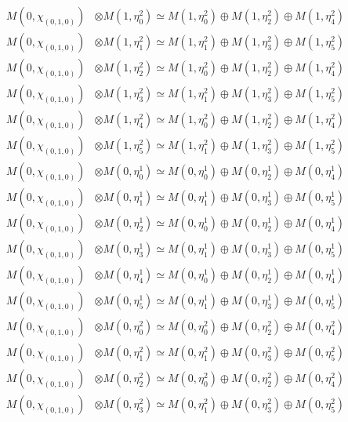 \begin{align*}
M(0,\chi_{(0,1,0)}) &\otimes M(1,\eta^{2}_{0}) \simeq M(1,\eta^{2}_{0}) \oplus M(1,\eta^{2}_{2}) \oplus M(1,\eta^{2}_{4}) \\
M(0,\chi_{(0,1,0)}) &\otimes M(1,\eta^{2}_{1}) \simeq M(1,\eta^{2}_{1}) \oplus M(1,\eta^{2}_{3}) \oplus M(1,\eta^{2}_{5}) \\
M(0,\chi_{(0,1,0)}) &\otimes M(1,\eta^{2}_{2}) \simeq M(1,\eta^{2}_{0}) \oplus M(1,\eta^{2}_{2}) \oplus M(1,\eta^{2}_{4}) \\
M(0,\chi_{(0,1,0)}) &\otimes M(1,\eta^{2}_{3}) \simeq M(1,\eta^{2}_{1}) \oplus M(1,\eta^{2}_{3}) \oplus M(1,\eta^{2}_{5}) \\
M(0,\chi_{(0,1,0)}) &\otimes M(1,\eta^{2}_{4}) \simeq M(1,\eta^{2}_{0}) \oplus M(1,\eta^{2}_{2}) \oplus M(1,\eta^{2}_{4}) \\
M(0,\chi_{(0,1,0)}) &\otimes M(1,\eta^{2}_{5}) \simeq M(1,\eta^{2}_{1}) \oplus M(1,\eta^{2}_{3}) \oplus M(1,\eta^{2}_{5}) \\
M(0,\chi_{(0,1,0)}) &\otimes M(0,\eta^{1}_{0}) \simeq M(0,\eta^{1}_{0}) \oplus M(0,\eta^{1}_{2}) \oplus M(0,\eta^{1}_{4}) \\
M(0,\chi_{(0,1,0)}) &\otimes M(0,\eta^{1}_{1}) \simeq M(0,\eta^{1}_{1}) \oplus M(0,\eta^{1}_{3}) \oplus M(0,\eta^{1}_{5}) \\
M(0,\chi_{(0,1,0)}) &\otimes M(0,\eta^{1}_{2}) \simeq M(0,\eta^{1}_{0}) \oplus M(0,\eta^{1}_{2}) \oplus M(0,\eta^{1}_{4}) \\
M(0,\chi_{(0,1,0)}) &\otimes M(0,\eta^{1}_{3}) \simeq M(0,\eta^{1}_{1}) \oplus M(0,\eta^{1}_{3}) \oplus M(0,\eta^{1}_{5}) \\
M(0,\chi_{(0,1,0)}) &\otimes M(0,\eta^{1}_{4}) \simeq M(0,\eta^{1}_{0}) \oplus M(0,\eta^{1}_{2}) \oplus M(0,\eta^{1}_{4}) \\
M(0,\chi_{(0,1,0)}) &\otimes M(0,\eta^{1}_{5}) \simeq M(0,\eta^{1}_{1}) \oplus M(0,\eta^{1}_{3}) \oplus M(0,\eta^{1}_{5}) \\
M(0,\chi_{(0,1,0)}) &\otimes M(0,\eta^{2}_{0}) \simeq M(0,\eta^{2}_{0}) \oplus M(0,\eta^{2}_{2}) \oplus M(0,\eta^{2}_{4}) \\
M(0,\chi_{(0,1,0)}) &\otimes M(0,\eta^{2}_{1}) \simeq M(0,\eta^{2}_{1}) \oplus M(0,\eta^{2}_{3}) \oplus M(0,\eta^{2}_{5}) \\
M(0,\chi_{(0,1,0)}) &\otimes M(0,\eta^{2}_{2}) \simeq M(0,\eta^{2}_{0}) \oplus M(0,\eta^{2}_{2}) \oplus M(0,\eta^{2}_{4}) \\
M(0,\chi_{(0,1,0)}) &\otimes M(0,\eta^{2}_{3}) \simeq M(0,\eta^{2}_{1}) \oplus M(0,\eta^{2}_{3}) \oplus M(0,\eta^{2}_{5}) \\

\end{align*}
